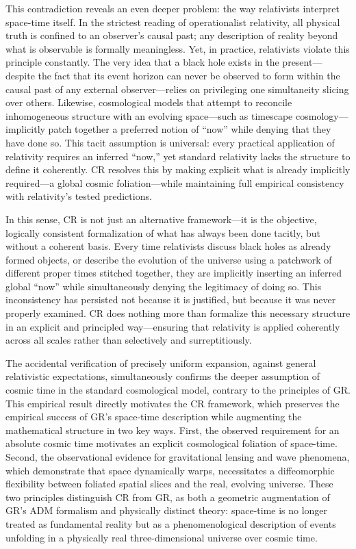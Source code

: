 \documentclass[aps,prd,reprint,superscriptaddress]{revtex4-2}
\begin{document}
This contradiction reveals an even deeper problem: the way relativists interpret space-time itself. In the strictest reading of operationalist relativity, all physical truth is confined to an observer's causal past; any description of reality beyond what is observable is formally meaningless. Yet, in practice, relativists violate this principle constantly. The very idea that a black hole exists in the present---despite the fact that its event horizon can never be observed to form within the causal past of any external observer---relies on privileging one simultaneity slicing over others. Likewise, cosmological models that attempt to reconcile inhomogeneous structure with an evolving space---such as timescape cosmology---implicitly patch together a preferred notion of ``now'' while denying that they have done so. This tacit assumption is universal: every practical application of relativity requires an inferred ``now,'' yet standard relativity lacks the structure to define it coherently. CR resolves this by making explicit what is already implicitly required---a global cosmic foliation---while maintaining full empirical consistency with relativity's tested predictions.

In this sense, CR is not just an alternative framework---it is the objective, logically consistent formalization of what has always been done tacitly, but without a coherent basis. Every time relativists discuss black holes as already formed objects, or describe the evolution of the universe using a patchwork of different proper times stitched together, they are implicitly inserting an inferred global ``now'' while simultaneously denying the legitimacy of doing so. This inconsistency has persisted not because it is justified, but because it was never properly examined. CR does nothing more than formalize this necessary structure in an explicit and principled way---ensuring that relativity is applied coherently across all scales rather than selectively and surreptitiously.

The accidental verification of precisely uniform expansion, against general relativistic expectations, simultaneously confirms the deeper assumption of cosmic time in the standard cosmological model, contrary to the principles of GR. This empirical result directly motivates the CR framework, which preserves the empirical success of GR's space-time description while augmenting the mathematical structure in two key ways. First, the observed requirement for an absolute cosmic time motivates an explicit cosmological foliation of space-time. Second, the observational evidence for gravitational lensing and wave phenomena, which demonstrate that space dynamically warps, necessitates a diffeomorphic flexibility between foliated spatial slices and the real, evolving universe. These two principles distinguish CR from GR, as both a geometric augmentation of GR's ADM formalism and physically distinct theory: space-time is no longer treated as fundamental reality but as a phenomenological description of events unfolding in a physically real three-dimensional universe over cosmic time.
\end{document}
